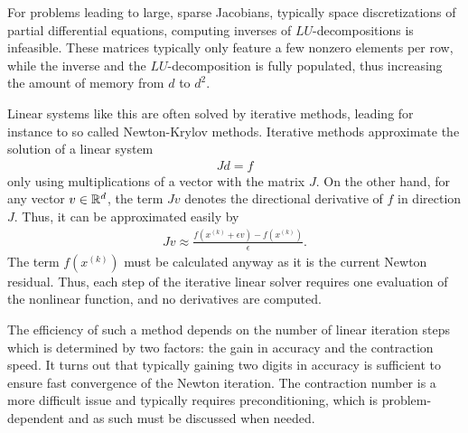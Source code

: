 \begin{remark}
  For problems leading to large, sparse Jacobians, typically space
  discretizations of partial differential equations, computing
  inverses of $LU$-decompositions is infeasible. These matrices
  typically only feature a few nonzero elements per row, while the
  inverse and the $LU$-decomposition is fully populated, thus
  increasing the amount of memory from $d$ to $d^2$.

  Linear systems like this are often solved by iterative methods,
  leading for instance to so called Newton-Krylov methods. Iterative
  methods approximate the solution of a linear system
  \begin{gather*}
    J d = f
  \end{gather*}
  only using multiplications of a vector with the matrix $J$. On
  the other hand, for any vector $v\in \mathbb R^d$, the term $Jv$ denotes
  the directional derivative of $f$ in direction $J$. Thus, it can be
  approximated easily by
  \begin{gather*}
    J v \approx \frac{f\left(x^{(k)}+\epsilon v\right) -
      f\left(x^{(k)}\right)}{\epsilon}.
  \end{gather*}
  The term $f\left(x^{(k)}\right)$ must be calculated anyway as it is
  the current Newton residual. Thus, each step of the iterative linear
  solver requires one evaluation of the nonlinear function, and no
  derivatives are computed.

  The efficiency of such a method depends on the number of linear
  iteration steps which is determined by two factors: the gain in
  accuracy and the contraction speed. It turns out that typically
  gaining two digits in accuracy is sufficient to ensure fast
  convergence of the Newton iteration. The contraction number is a
  more difficult issue and typically requires preconditioning, which
  is problem-dependent and as such must be discussed when needed.
\end{remark}

